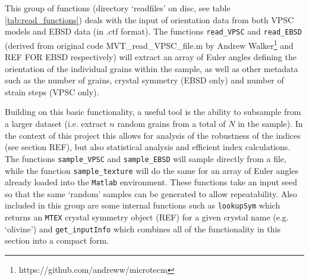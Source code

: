 \documentclass[a4paper,12pt]{report}
\numberwithin{equation}{chapter}
\begin{document}
This group of functions (directory \lq{}readfiles\rq{} on disc, see table \ref{tab:read_functions}) deals with the input of orientation data from both VPSC models and EBSD data (in .ctf format). The functions \texttt{read\_{}VPSC} and \texttt{read\_{}EBSD} (derived from original code MVT\_{}read\_{}VPSC\_{}file.m by Andrew Walker\footnote{https://github.com/andreww/microtecm} and REF FOR EBSD respectively) will extract an array of Euler angles defining the orientation of the individual grains within the sample, as well as other metadata such as the number of grains, crystal symmetry (EBSD only) and number of strain steps (VPSC only).                                                

Building on this basic functionality, a useful tool is the ability to subsample from a larger dataset (i.e. extract $n$ random grains from a total of $N$ in the sample). In the context of this project this allows for analysis of the robustness of the indices (see section REF), but also statistical analysis and efficient index calculations. The functions \texttt{sample\_{}VPSC} and \texttt{sample\_{}EBSD} will sample directly from a file, while the function \texttt{sample\_{}texture} will do the same for an array of Euler angles already loaded into the \texttt{Matlab} environment. These functions take an input seed so that the same \lq{}random\rq{} samples can be generated to allow repeatability. Also included in this group are some internal functions such as \texttt{lookupSym} which returns an \texttt{MTEX} crystal symmetry object (REF) for a given crystal name (e.g. \lq{}olivine\rq{}) and \texttt{get\_{}inputInfo} which combines all of the functionality in this section into a compact form.                                                                                                                            
\end{document}
